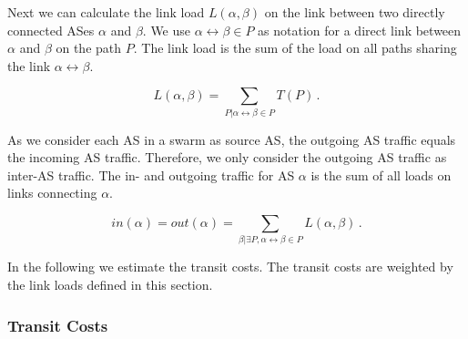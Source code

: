 Next we can calculate the link load $L(\alpha,\beta)$ on the link between two directly connected ASes $\alpha$ and $\beta$. We use $\alpha\leftrightarrow \beta \in P$ as notation for a direct link between $\alpha$ and $\beta$ on the path $P$. The link load is the sum of the load on all paths sharing the link $\alpha\leftrightarrow\beta$.

\begin{equation}\label{equ:linkload}
L(\alpha,\beta)=\sum_{P|\alpha\leftrightarrow \beta \in P} T(P) \, .
\end{equation}

As we consider each AS in a swarm as source AS, the outgoing AS traffic equals the incoming AS traffic. Therefore, we only consider the outgoing AS traffic as inter-AS traffic. The in- and outgoing traffic for AS $\alpha$ is the sum of all loads on links connecting $\alpha$.

\begin{equation}\label{equ:outgoing}
in(\alpha) = out(\alpha) = \sum_{\beta| \exists P, \alpha\leftrightarrow \beta \in P} L(\alpha,\beta) \, .
\end{equation}

In the following we estimate the transit costs. The transit costs are weighted by the link loads defined in this section.



\subsubsection{Transit Costs}

